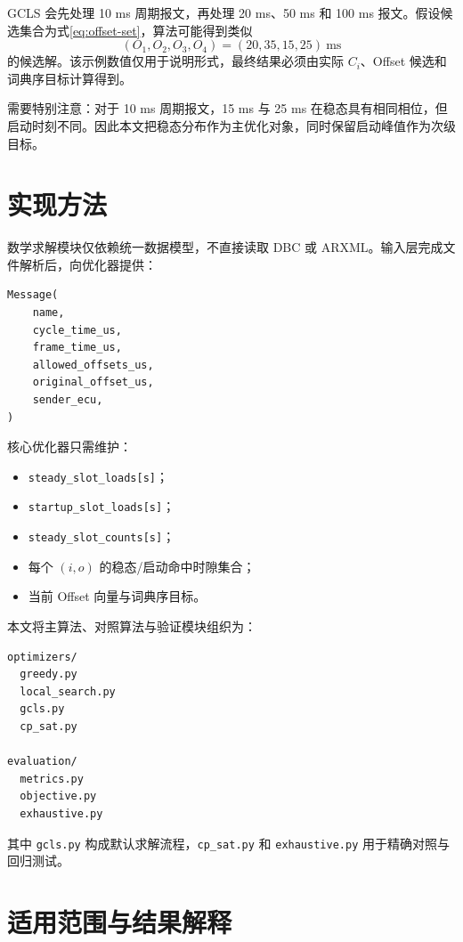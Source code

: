 \documentclass[UTF8,12pt,a4paper]{ctexart}
\begin{document}
GCLS 会先处理 10 ms 周期报文，再处理 20 ms、50 ms 和 100 ms 报文。假设候选集合为式\eqref{eq:offset-set}，算法可能得到类似
\begin{equation}
 (O_1,O_2,O_3,O_4)=(20,35,15,25)\ \mathrm{ms}
\end{equation}
的候选解。该示例数值仅用于说明形式，最终结果必须由实际 $C_i$、Offset 候选和词典序目标计算得到。

需要特别注意：对于 10 ms 周期报文，15 ms 与 25 ms 在稳态具有相同相位，但启动时刻不同。因此本文把稳态分布作为主优化对象，同时保留启动峰值作为次级目标。

\section{实现方法}

数学求解模块仅依赖统一数据模型，不直接读取 DBC 或 ARXML。输入层完成文件解析后，向优化器提供：

\begin{lstlisting}
Message(
    name,
    cycle_time_us,
    frame_time_us,
    allowed_offsets_us,
    original_offset_us,
    sender_ecu,
)
\end{lstlisting}

核心优化器只需维护：

\begin{itemize}
  \item \texttt{steady\_slot\_loads[s]}；
  \item \texttt{startup\_slot\_loads[s]}；
  \item \texttt{steady\_slot\_counts[s]}；
  \item 每个 $(i,o)$ 的稳态/启动命中时隙集合；
  \item 当前 Offset 向量与词典序目标。
\end{itemize}

本文将主算法、对照算法与验证模块组织为：

\begin{lstlisting}
optimizers/
  greedy.py
  local_search.py
  gcls.py
  cp_sat.py

evaluation/
  metrics.py
  objective.py
  exhaustive.py
\end{lstlisting}

其中 \texttt{gcls.py} 构成默认求解流程，\texttt{cp\_sat.py} 和 \texttt{exhaustive.py} 用于精确对照与回归测试。

\section{适用范围与结果解释}
\end{document}
